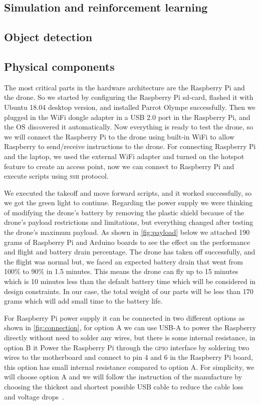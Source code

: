 \documentclass[../main.tex]{subfiles}
\begin{document}
\subsection{Simulation and reinforcement learning}

\lipsum[1]

\subsection{Object detection}

\lipsum[1]

\subsection{Physical components}
The most critical parts in the hardware
architecture are the Raspberry Pi and the drone. 
So we started by configuring the Raspberry Pi sd-card,
flashed it with Ubuntu 18.04 desktop version,
and installed Parrot Olympe successfully. 
Then we plugged in the WiFi dongle adapter
in a USB 2.0 port in the Raspberry Pi, 
and the OS discovered it automatically. 
Now everything is ready to test the 
\anafi drone, so we will connect the
Raspberry Pi to the drone using built-in WiFi
to allow Raspberry to send/receive instructions
to the drone. 
For connecting Raspberry Pi and the laptop, 
we used the external WiFi adapter and turned on the hotspot feature to create an access point,
now we can connect to Raspberry Pi and execute 
scripts using \textsc{ssh} protocol.

We executed the takeoff and move forward scripts,
and it worked successfully, so we got the green 
light to continue. 
Regarding the power supply we were thinking of modifying the drone's battery
by removing the plastic shield because of the drone's
payload restrictions and limitations, but everything changed after 
testing the drone's maximum payload. As shown in \cref{fig:payload} below
we attached 190 grams of Raspberry Pi and Arduino boards
to see the effect on the performance and flight and
battery drain percentage. 
The drone has taken off  successfully, 
and the flight was normal but, we faced an expected 
battery drain that went from 100\% to 90\% in 1.5 minutes.
This means the drone can fly up to 15 minutes which is 
10 minutes less than the default battery time 
which will be considered in design constraints.
In our case, the total weight of our parts will be 
less than 170 grams which will add small time
to the battery life.

For Raspberry Pi power supply it can be connected in 
two different options as shown in \cref{fig:connection},
for option A we can use USB-A to power the Raspberry directly without
need to solder any wires,
but there is some internal resistance,
in option B it Power the Raspberry Pi through the \textsc{gpio} 
interface by soldering two wires to the motherboard and 
connect to pin 4 and 6 in the Raspberry Pi board,
this option has small internal resistance compared to option A.
For simplicity, we will choose option A and we will 
follow the instruction of the manufacture by choosing 
the thickest and shortest possible USB cable to reduce 
the cable loss and voltage drops~\cite{makerfocus}. 	 
\end{document}
